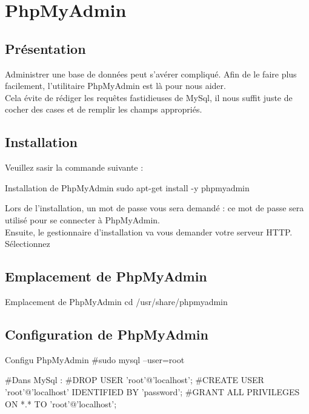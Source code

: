 \chapter{PhpMyAdmin}

\section{Présentation}
Administrer une base de données peut s'avérer compliqué. Afin de le faire plus facilement, l'utilitaire PhpMyAdmin est là pour nous aider. \\
Cela évite de rédiger les requêtes fastidieuses de MySql, il nous suffit juste de cocher des cases et de remplir les champs appropriés. \\
\section{Installation}
Veuillez sasir la commande suivante : 
\begin{Bash}{Installation de PhpMyAdmin}
sudo apt-get install -y phpmyadmin
\end{Bash}

Lors de l’installation, un mot de passe vous sera demandé : ce mot de passe sera utilisé pour se connecter à PhpMyAdmin. \\

Ensuite, le gestionnaire d’installation va vous demander votre serveur HTTP.
Sélectionnez 





\section{Emplacement de PhpMyAdmin}

\begin{Bash}{Emplacement de PhpMyAdmin}
cd /usr/share/phpmyadmin
\end{Bash}


\section{Configuration de PhpMyAdmin}

\begin{Bash}{Configu PhpMyAdmin}
#sudo mysql --user=root

#Dans MySql :
#DROP USER 'root'@'localhost';
#CREATE USER 'root'@'localhost' IDENTIFIED BY 'password';
#GRANT ALL PRIVILEGES ON *.* TO 'root'@'localhost';


\end{Bash}



